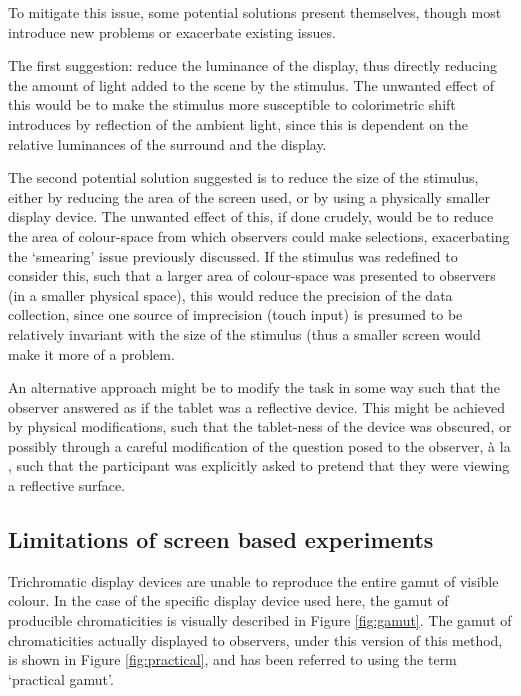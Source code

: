 To mitigate this issue, some potential solutions present themselves, though most introduce new problems or exacerbate existing issues. 

The first suggestion: reduce the luminance of the display, thus directly reducing the amount of light added to the scene by the stimulus. The unwanted effect of this would be to make the stimulus more susceptible to colorimetric shift introduces by reflection of the ambient light, since this is dependent on the relative luminances of the surround and the display. 

The second potential solution suggested is to reduce the size of the stimulus, either by reducing the area of the screen used, or by using a physically smaller display device. The unwanted effect of this, if done crudely, would be to reduce the area of colour-space from which observers could make selections, exacerbating the `smearing' issue previously discussed. If the stimulus was redefined to consider this, such that a larger area of colour-space was presented to observers (in a smaller physical space), this would reduce the precision of the data collection, since one source of imprecision (touch input) is presumed to be relatively invariant with the size of the stimulus (thus a smaller screen would make it more of a problem.

An alternative approach might be to modify the task in some way such that the observer answered as if the tablet was a reflective device. This might be achieved by physical modifications, such that the tablet-ness of the device was obscured, or possibly through a careful modification of the question posed to the observer, à la \citet{arend_simultaneous_1986}, such that the participant was explicitly asked to pretend that they were viewing a reflective surface.

\subsection{Limitations of screen based experiments} \label{sec:bounding}

Trichromatic display devices are unable to reproduce the entire gamut of visible colour. In the case of the specific display device used here, the gamut of producible chromaticities is visually described in Figure \ref{fig:gamut}. The gamut of chromaticities actually displayed to observers, under this version of this method, is shown in Figure \ref{fig:practical}, and has been referred to using the term `practical gamut'.

